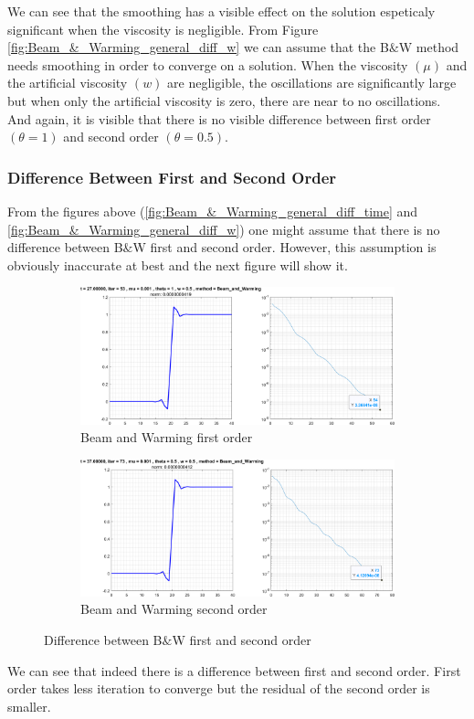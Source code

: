 \documentclass[11pt, a4paper]{article}
\begin{document}
We can see that the smoothing has a visible effect on the solution espeticaly significant when the viscosity is negligible. From Figure \ref{fig:Beam_&_Warming_general_diff_w} we can assume that the B$\&$W method needs smoothing in order to converge on a solution. When the viscosity $\left(\mu\right)$ and the artificial viscosity $\left(w\right)$ are negligible, the oscillations are significantly large but when only the artificial viscosity is zero, there are near to no oscillations. And again, it is visible that there is no visible difference between first order $\left(\theta=1\right)$ and second order $\left(\theta=0.5\right)$.

\subsubsection{Difference Between First and Second Order}
From the figures above (\ref{fig:Beam_&_Warming_general_diff_time} and \ref{fig:Beam_&_Warming_general_diff_w}) one might assume that there is no difference between B$\&$W first and second order. However, this assumption is obviously inaccurate at best and the next figure will show it.
\begin{figure}[H]
    \centering
    \begin{subfigure}[c]{\textwidth}
        \centering
        \includegraphics[width=\textwidth]{images/B&W first.png}
        \caption{Beam and Warming first order}
        \label{fig:B&W_1vs2_A}
    \end{subfigure}
    \hfill
    \begin{subfigure}[c]{\textwidth}
        \centering
        \includegraphics[width=\textwidth]{images/B&W second.png}
        \caption{Beam and Warming second order}
        \label{fig:B&W_1vs2_B}
    \end{subfigure}
    \caption{Difference between B$\&$W first and second order}
        \label{fig:B&W_1vs2}
\end{figure}
\noindent We can see that indeed there is a difference between first and second order. First order takes less iteration to converge but the residual of the second order is smaller.
\end{document}
